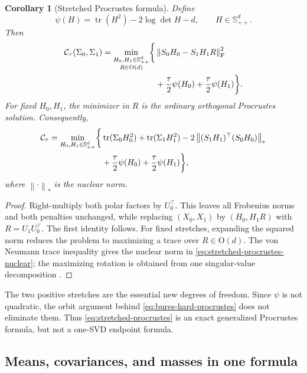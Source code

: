 \documentclass[11pt]{article}
\newtheorem{corollary}[theorem]{Corollary}
\theoremstyle{definition}
\theoremstyle{remark}
\newcommand{\R}{\mathbb R}
\newcommand{\Spp}{\mathbb S_{++}^d}
\newcommand{\tr}{\operatorname{tr}}
\newcommand{\norm}[1]{\left\lVert #1\right\rVert}
\begin{document}
\begin{corollary}[Stretched Procrustes formula]\label{cor:stretched-procrustes}
Define
\begin{equation}\label{eq:psi-spd}
 \psi(H)=\tr(H^2)-2\log\det H-d,
 \qquad H\in\Spp.
\end{equation}
Then
\begin{align}
 \mathcal C_\tau(\Sigma_0,\Sigma_1)
 =\min_{\substack{H_0,H_1\in\Spp\\R\in\mathrm O(d)}}
 \biggl\{&
   \norm{S_0H_0-S_1H_1R}_{\mathrm F}^2\notag\\
 &+\frac\tau2\psi(H_0)+\frac\tau2\psi(H_1)
 \biggr\}.
 \label{eq:stretched-procrustes}
\end{align}
For fixed $H_0,H_1$, the minimizer in $R$ is the ordinary orthogonal
Procrustes solution. Consequently,
\begin{align}
 \mathcal C_\tau
 =\min_{H_0,H_1\in\Spp}\biggl\{&
   \tr(\Sigma_0H_0^2)+\tr(\Sigma_1H_1^2)
   -2\norm{(S_1H_1)^\top(S_0H_0)}_*
   \notag\\
 &+\frac\tau2\psi(H_0)+\frac\tau2\psi(H_1)
 \biggr\},
 \label{eq:stretched-procrustes-nuclear}
\end{align}
where $\norm{\cdot}_*$ is the nuclear norm.
\end{corollary}

\begin{proof}
Right-multiply both polar factors by $U_0^\top$. This leaves all Frobenius
norms and both penalties unchanged, while replacing $(X_0,X_1)$ by
$(H_0,H_1R)$ with $R=U_1U_0^\top$. The first identity follows. For fixed
stretches, expanding the squared norm reduces the problem to maximizing a
trace over $R\in\mathrm O(d)$. The von Neumann trace inequality gives the
nuclear norm in \eqref{eq:stretched-procrustes-nuclear}; the maximizing
rotation is obtained from one singular-value decomposition
\citep{Schonemann1966}.
\end{proof}

The two positive stretches are the essential new degrees of freedom. Since
$\psi$ is not quadratic, the orbit argument behind
\eqref{eq:bures-hard-procrustes} does not eliminate them. Thus
\eqref{eq:stretched-procrustes} is an exact generalized Procrustes formula,
but not a one-SVD endpoint formula.

\subsection{Means, covariances, and masses in one formula}
\end{document}
